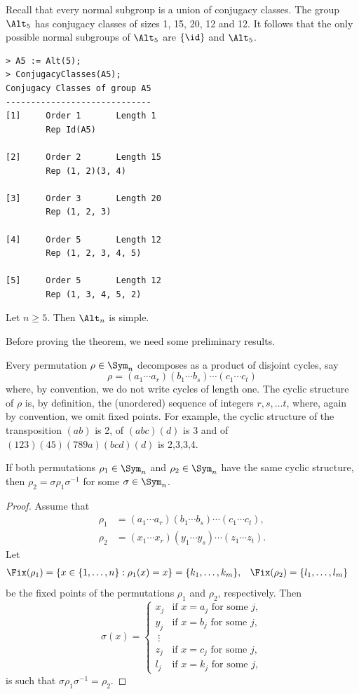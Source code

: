Recall that every normal subgroup is a union of conjugacy classes. The group 
$\Alt_5$ has conjugacy classes of sizes 1, 15, 20, 12 and 12. It follows that 
the only possible normal subgroups of $\Alt_5$ are $\{\id\}$ and $\Alt_5$. 
\begin{lstlisting}
> A5 := Alt(5);
> ConjugacyClasses(A5);
Conjugacy Classes of group A5
-----------------------------
[1]     Order 1       Length 1
        Rep Id(A5)

[2]     Order 2       Length 15
        Rep (1, 2)(3, 4)

[3]     Order 3       Length 20
        Rep (1, 2, 3)

[4]     Order 5       Length 12
        Rep (1, 2, 3, 4, 5)

[5]     Order 5       Length 12
        Rep (1, 3, 4, 5, 2)
\end{lstlisting}

\begin{theorem}[Jordan]
\label{thm:Jordan}
    Let $n\geq5$. Then $\Alt_n$ is simple. 
\end{theorem}

Before proving the theorem, we need some preliminary results.

Every permutation $\rho\in\Sym_n$ decomposes as a product of disjoint cycles, say
\[
\rho=(a_1\cdots a_r)(b_1\cdots b_s)\cdots (c_1\cdots c_t)
\]
where, by convention, we do not write cycles of length one. 
The cyclic structure of $\rho$ is, by definition, the (unordered) 
sequence of integers $r,s,\dots t$, where, again by convention,  
we omit fixed points. For example, the cyclic structure of 
the transposition $(ab)$ is 2, 
of $(abc)(d)$ is 3 and of $(123)(45)(789a)(bcd)(d)$ is 2,3,3,4. 

\begin{lemma}
If both permutations $\rho_1\in\Sym_n$ and $\rho_2\in\Sym_n$ have the same
cyclic structure, then 
$\rho_2=\sigma\rho_1\sigma^{-1}$ for some
$\sigma\in\Sym_n$. 
\end{lemma}

\begin{proof}
Assume that 
\begin{align*}
\rho_1&=(a_1\cdots a_r)(b_1\cdots b_s)\cdots (c_1\cdots c_t),\\
\rho_2&=(x_1\cdots x_r)(y_1\cdots y_s)\cdots (z_1\cdots z_t).
\end{align*}
Let  
\begin{align*}
\Fix(\rho_1) &= \{x\in\{1,\dots,n\}:\rho_1(x)=x\}=\{k_1,\dots,k_m\},&&
\Fix(\rho_2)=\{l_1,\dots,l_m\}	
\end{align*}
be the fixed points of the permutations $\rho_1$ and $\rho_2$,
respectively. Then 
\[
\sigma(x)=\begin{cases}
x_j & \text{if $x=a_j$ for some $j$},\\
y_j & \text{if $x=b_j$ for some $j$},\\
\;\vdots\\
z_j & \text{if $x=c_j$ for some $j$},\\
l_j & \text{if $x=k_j$ for some $j$},	
\end{cases}
\]
is such that $\sigma\rho_1\sigma^{-1}=\rho_2$. 
\end{proof}

